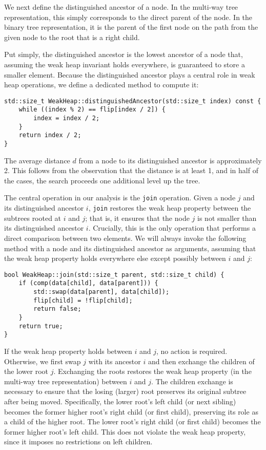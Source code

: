 We next define the distinguished ancestor of a node. In the multi-way tree representation, this simply corresponds to the direct parent of the node. In the binary tree representation, it is the parent of the first node on the path from the given node to the root that is a right child. 

Put simply, the distinguished ancestor is the lowest ancestor of a node that, assuming the weak heap invariant holds everywhere, is guaranteed to store a smaller element. Because the distinguished ancestor plays a central role in weak heap operations, we define a dedicated method to compute it:

\begin{verbatim}
std::size_t WeakHeap::distinguishedAncestor(std::size_t index) const {
    while ((index % 2) == flip[index / 2]) {
        index = index / 2;
    }
    return index / 2;
}
\end{verbatim}

The average distance \({d}\) from a node to its distinguished ancestor is approximately 2. This follows from the observation that the distance is at least 1, and in half of the cases, the search proceeds one additional level up the tree.

The central operation in our analysis is the \texttt{join} operation. Given a node \(j\) and its distinguished ancestor \(i\), \texttt{join} restores the weak heap property between the subtrees rooted at \(i\) and \(j\); that is, it ensures that the node \(j\) is not smaller than its distinguished ancestor \(i\). Crucially, this is the only operation that performs a direct comparison between two elements. We will always invoke the following method with a node and its distinguished ancestor as arguments, assuming that the weak heap property holds everywhere else except possibly between \(i\) and \(j\):

\begin{verbatim}
bool WeakHeap::join(std::size_t parent, std::size_t child) {
    if (comp(data[child], data[parent])) {
        std::swap(data[parent], data[child]);
        flip[child] = !flip[child];
        return false;
    }
    return true;
}
\end{verbatim}

If the weak heap property holds between \(i\) and \(j\), no action is required. Otherwise, we first swap \(j\) with its ancestor \(i\) and then exchange the children of the lower root \(j\). Exchanging the roots restores the weak heap property (in the multi-way tree representation) between \(i\) and \(j\). The children exchange is necessary to ensure that the losing (larger) root preserves its original subtree after being moved. Specifically, the lower root’s left child (or next sibling) becomes the former higher root’s right child (or first child), preserving its role as a child of the higher root. The lower root’s right child (or first child) becomes the former higher root’s left child. This does not violate the weak heap property, since it imposes no restrictions on left children.

